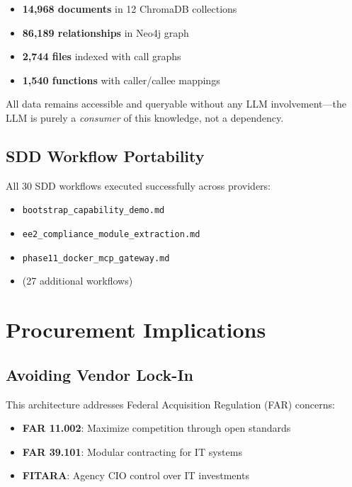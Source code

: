 \documentclass[11pt,twocolumn]{article}
\begin{document}
\begin{itemize}
    \item \textbf{14,968 documents} in 12 ChromaDB collections
    \item \textbf{86,189 relationships} in Neo4j graph
    \item \textbf{2,744 files} indexed with call graphs
    \item \textbf{1,540 functions} with caller/callee mappings
\end{itemize}

All data remains accessible and queryable without any LLM involvement—the LLM is purely a \textit{consumer} of this knowledge, not a dependency.

\subsection{SDD Workflow Portability}

All 30 SDD workflows executed successfully across providers:

\begin{itemize}
    \item \texttt{bootstrap\_capability\_demo.md}
    \item \texttt{ee2\_compliance\_module\_extraction.md}
    \item \texttt{phase11\_docker\_mcp\_gateway.md}
    \item (27 additional workflows)
\end{itemize}

\section{Procurement Implications}

\subsection{Avoiding Vendor Lock-In}

This architecture addresses Federal Acquisition Regulation (FAR) concerns:

\begin{itemize}
    \item \textbf{FAR 11.002}: Maximize competition through open standards
    \item \textbf{FAR 39.101}: Modular contracting for IT systems
    \item \textbf{FITARA}: Agency CIO control over IT investments
\end{itemize}
\end{document}
